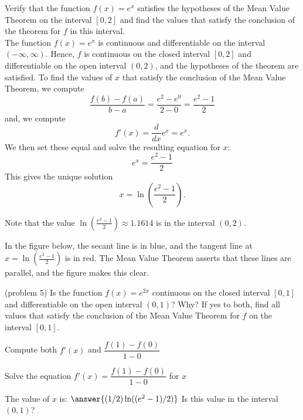 \documentclass[handout]{ximera}
\begin{document}
\begin{example}[example 5]
Verify that the function $f(x) = e^x$ satisfies the hypotheses of the Mean Value Theorem
on the interval $[0,2]$ and find the values that satisfy the conclusion of the theorem for $f$ in this interval.\\
The function $f(x) = e^x$ is continuous and differentiable on the interval $(-\infty, \infty)$. 
Hence, $f$ is continuous on the closed interval $[0, 2]$ and differentiable on the open interval $(0, 2)$, and the hypotheses of the theorem are satisfied.
To find the values of $x$ that satisfy the conclusion of the Mean Value Theorem, we compute
\[\frac{f(b) - f(a)}{b-a} = \frac{e^2 - e^0}{2-0} = \frac{e^2 - 1}{2}\]
and, we compute
\[f'(x) = \frac{d}{dx} e^x = e^x.\]
We then set these equal and solve the resulting equation for $x$:
\[e^x = \frac{e^2 - 1}{2}\]
This gives the unique solution
\[ x = \ln(\frac{e^2 - 1}{2}).\]

Note that the value $\ln(\frac{e^2 - 1}{2}) \approx 1.1614$ is in the interval $(0,2)$.

In the figure below, the secant line is in blue, 
and the tangent line at $x = \ln(\frac{e^2 - 1}{2})$ is in red. The Mean Value Theorem asserts that these lines are parallel, and the figure makes this clear.

\begin{image}
\end{image}

\end{example}


\begin{problem}(problem 5)
  Is the function $f(x) = e^{2x}$ continuous on the closed interval $[0,1]$ and differentiable on the open interval $(0,1)$? Why?
  If yes to both, find all values that satisfy the conclusion of the Mean Value Theorem for $f$ on the interval $[0,1]$.

    \begin{hint}
      Compute both $f'(x)$ and $\dfrac{f(1) - f(0)}{1-0}$
    \end{hint}
		\begin{hint}
		  Solve the equation $f'(x) = \dfrac{f(1) - f(0)}{1-0}$ for $x$
		\end{hint}
		
		The value of $x$ is:
		 $\answer{(1/2) \ln((e^2 -1)/2)}$
		 Is this value in the interval $(0,1)$?
\end{problem}
\end{document}
